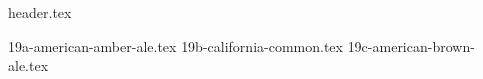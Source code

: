 \clearpage
{}
\divisorLine
{header.tex}
\begin{multicols}{2}
{19a-american-amber-ale.tex}
{19b-california-common.tex}
{19c-american-brown-ale.tex}
\end{multicols}